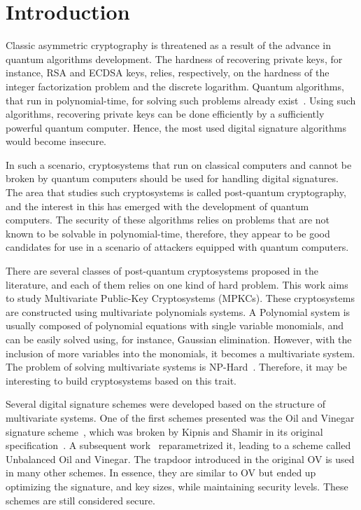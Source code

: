 \documentclass{ufsctex/ufsctex}
\makeatletter
\renewcommand{\listadeabreviaturas}{
	\pretextualchapter{List of Acronyms}\@starttoc{las}}
\renewcommand{\listadesimbolos}{
	\pretextualchapter{List of Symbols}\@starttoc{lsb}}
\renewcommand{\listadealgoritmos}{
	\pretextualchapter{List of Algorithms}\@starttoc{loa}}
\makeatother
\begin{document}
\capa{}
\pretextuais{}
\listadefiguras{}
\listadeabreviaturas{}
\sumario{}

\chapter{Introduction}

Classic asymmetric cryptography is threatened as a result of the advance in
quantum algorithms development. The hardness of recovering private keys, for
instance, RSA and ECDSA keys, relies, respectively, on the hardness
of the integer factorization problem and the discrete logarithm. Quantum
algorithms, that run in polynomial-time, for solving such problems already
exist~\cite{shor1999polynomial}. Using such algorithms, recovering private keys
can be done efficiently by a sufficiently powerful quantum computer. Hence, the
most used digital signature algorithms would become insecure.

In such a scenario, cryptosystems that run on classical computers and cannot be
broken by quantum computers should be used for handling digital signatures. The
area that studies such cryptosystems is called post-quantum cryptography, and
the interest in this has emerged with the development of quantum computers. The
security of these algorithms relies on problems that are not known to be
solvable in polynomial-time, therefore, they appear to be good candidates for
use in a scenario of attackers equipped with quantum computers.

There are several classes of post-quantum cryptosystems proposed in the
literature, and each of them relies on one kind of hard problem. This work aims
to study Multivariate Public-Key Cryptosystems
(MPKCs). These
cryptosystems are constructed using multivariate polynomials systems. A
Polynomial system is usually composed of polynomial equations with single
variable monomials, and can be easily solved using, for instance, Gaussian
elimination. However, with the inclusion of more variables into the monomials,
it becomes a multivariate system. The problem of solving multivariate systems
is NP-Hard~\cite{garey1979npc}. Therefore, it may be interesting to build
cryptosystems based on this trait.

Several digital signature schemes were developed based on the structure of
multivariate systems. One of the first schemes presented was the Oil and
Vinegar signature scheme~\cite{patarin1997ov}, which
was broken by Kipnis and Shamir in its original
specification~\cite{kipnis1998cryptanalysis}. A subsequent
work~\cite{kipnis1999unbalanced} reparametrized it, leading to a scheme called
Unbalanced Oil and Vinegar. The trapdoor
introduced in the original OV is used in many other schemes. In essence, they
are similar to OV but ended up optimizing the signature, and key sizes, while
maintaining security levels. These schemes are still considered secure.
\end{document}
